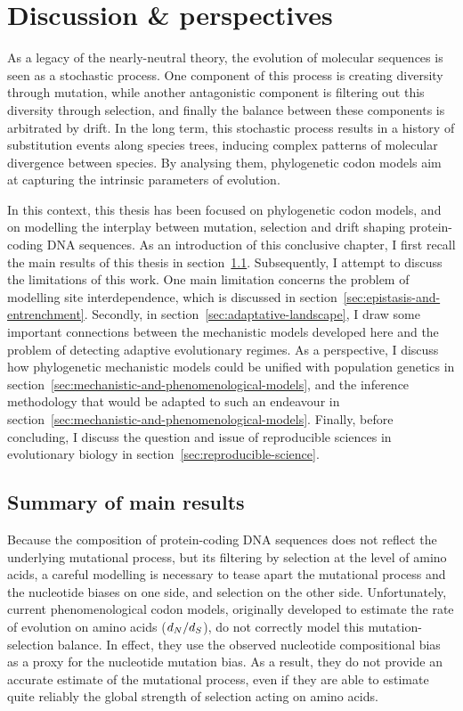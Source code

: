 \chapter{Discussion \& perspectives}
\label{ch:discussion-perspectives}
{\hypersetup{linkcolor=GREYDARK}\minitoc}

As a legacy of the nearly-neutral theory, the evolution of molecular sequences is seen as a stochastic process.
One component of this process is creating diversity through mutation, while another antagonistic component is filtering out this diversity through selection, and finally the balance between these components is arbitrated by drift.
In the long term, this stochastic process results in a history of substitution events along species trees, inducing complex patterns of molecular divergence between species.
By analysing them, phylogenetic codon models aim at capturing the intrinsic parameters of evolution.

In this context, this thesis has been focused on phylogenetic codon models, and on modelling the interplay between mutation, selection and drift shaping protein-coding \acrshort{DNA} sequences.
As an introduction of this conclusive chapter, I first recall the main results of this thesis in section~\ref{sec:summary-of-main-results}.
Subsequently, I attempt to discuss the limitations of this work.
One main limitation concerns the problem of modelling site interdependence, which is discussed in section~\ref{sec:epistasis-and-entrenchment}.
Secondly, in section~\ref{sec:adaptative-landscape}, I draw some important connections between the mechanistic models developed here and the problem of detecting adaptive evolutionary regimes.
As a perspective, I discuss how phylogenetic mechanistic models could be unified with population genetics in section~\ref{sec:mechanistic-and-phenomenological-models}, and the inference methodology that would be adapted to such an endeavour in section~\ref{sec:mechanistic-and-phenomenological-models}.
Finally, before concluding, I discuss the question and issue of reproducible sciences in evolutionary biology in section~\ref{sec:reproducible-science}.


\section{Summary of main results}
\label{sec:summary-of-main-results}

Because the composition of protein-coding \acrshort{DNA} sequences does not reflect the underlying mutational process, but its filtering by selection at the level of amino acids, a careful modelling is necessary to tease apart the mutational process and the nucleotide biases on one side, and selection on the other side.
Unfortunately, current phenomenological codon models, originally developed to estimate the rate of evolution on amino acids ($d_N / d_S$), do not correctly model this mutation-selection balance.
In effect, they use the observed nucleotide compositional bias as a proxy for the nucleotide mutation bias.
As a result, they do not provide an accurate estimate of the mutational process, even if they are able to estimate quite reliably the global strength of selection acting on amino acids.

